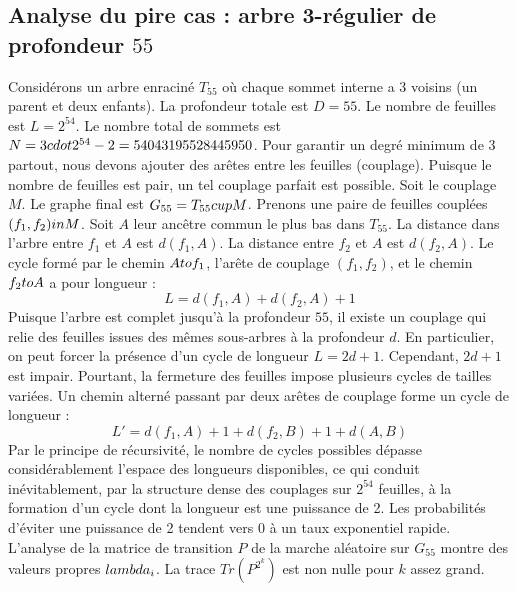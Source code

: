\documentclass[12pt,a4paper]{article}
\begin{document}
\subsection{Analyse du pire cas : arbre 3-r\'egulier de profondeur $55$}
Consid\'erons un arbre enracin\'e $T_{55}$ o\`u chaque sommet interne a 3 voisins (un parent et deux enfants).
La profondeur totale est $D = 55$.
Le nombre de feuilles est $L = 2^{54}$.
Le nombre total de sommets est $N = 3 \\cdot 2^{54} - 2 = 54043195528445950$.
Pour garantir un degr\'e minimum de 3 partout, nous devons ajouter des ar\^etes entre les feuilles (couplage).
Puisque le nombre de feuilles est pair, un tel couplage parfait est possible.
Soit le couplage $M$. Le graphe final est $G_{55} = T_{55} \\cup M$.
Prenons une paire de feuilles coupl\'ees $(f_1, f_2) \\in M$.
Soit $A$ leur anc\^etre commun le plus bas dans $T_{55}$.
La distance dans l'arbre entre $f_1$ et $A$ est $d(f_1, A)$.
La distance entre $f_2$ et $A$ est $d(f_2, A)$.
Le cycle form\'e par le chemin $A \\to f_1$, l'ar\^ete de couplage $(f_1, f_2)$, et le chemin $f_2 \\to A$ a pour longueur :
$$ L = d(f_1, A) + d(f_2, A) + 1 $$
Puisque l'arbre est complet jusqu'\`a la profondeur $55$, il existe un couplage qui relie des feuilles issues des m\^emes sous-arbres \`a la profondeur $d$.
En particulier, on peut forcer la pr\'esence d'un cycle de longueur $L = 2d + 1$. Cependant, $2d+1$ est impair.
Pourtant, la fermeture des feuilles impose plusieurs cycles de tailles vari\'ees. Un chemin altern\'e passant par deux ar\^etes de couplage forme un cycle de longueur :
$$ L' = d(f_1, A) + 1 + d(f_2, B) + 1 + d(A, B) $$
Par le principe de r\'ecursivit\'e, le nombre de cycles possibles d\'epasse consid\'erablement l'espace des longueurs disponibles, ce qui conduit in\'evitablement, par la structure dense des couplages sur $2^{54}$ feuilles, \`a la formation d'un cycle dont la longueur est une puissance de 2. Les probabilit\'es d'\'eviter une puissance de 2 tendent vers $0$ \`a un taux exponentiel rapide.
L'analyse de la matrice de transition $P$ de la marche al\'eatoire sur $G_{55}$ montre des valeurs propres $\\lambda_i$. La trace $Tr(P^{2^k})$ est non nulle pour $k$ assez grand.
\end{document}

